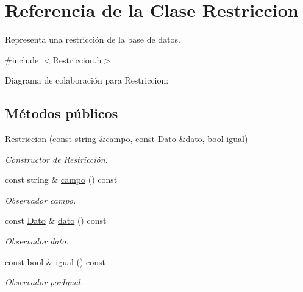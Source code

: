 \hypertarget{classRestriccion}{}\section{Referencia de la Clase Restriccion}
\label{classRestriccion}


Representa una restricción de la base de datos.  




{\ttfamily \#include $<$Restriccion.\+h$>$}



Diagrama de colaboración para Restriccion\+:
\subsection*{Métodos públicos}
\begin{DoxyCompactItemize}
\item 
\mbox{\hyperlink{classRestriccion_a6a2bb9363d1083319784caec16d9c47f}{Restriccion}} (const string \&\mbox{\hyperlink{classRestriccion_a00025b954d3f918c0769e5851aa6e19d}{campo}}, const \mbox{\hyperlink{classDato}{Dato}} \&\mbox{\hyperlink{classRestriccion_a54b0ae0865a0a3eee152931e22b8b7f8}{dato}}, bool \mbox{\hyperlink{classRestriccion_a00cadade77b720aeefb909b879d01647}{igual}})
\begin{DoxyCompactList}\small\item\em Constructor de Restricción. \end{DoxyCompactList}\item 
const string \& \mbox{\hyperlink{classRestriccion_a00025b954d3f918c0769e5851aa6e19d}{campo}} () const
\begin{DoxyCompactList}\small\item\em Observador campo. \end{DoxyCompactList}\item 
const \mbox{\hyperlink{classDato}{Dato}} \& \mbox{\hyperlink{classRestriccion_a54b0ae0865a0a3eee152931e22b8b7f8}{dato}} () const
\begin{DoxyCompactList}\small\item\em Observador dato. \end{DoxyCompactList}\item 
const bool \& \mbox{\hyperlink{classRestriccion_a00cadade77b720aeefb909b879d01647}{igual}} () const
\begin{DoxyCompactList}\small\item\em Observador por\+Igual. \end{DoxyCompactList}\end{DoxyCompactItemize}

